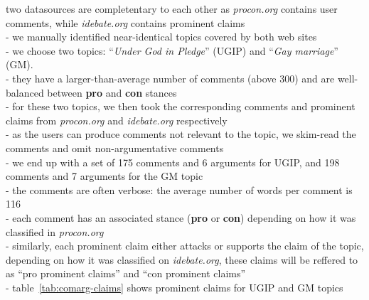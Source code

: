 \noindent two datasources are completentary to each other as 
\textit{procon.org} contains user comments, while \textit{idebate.org} contains prominent 
claims \\
- we manually identified near-identical topics covered by both web sites \\
- we choose two topics: ``\textit{Under God in Pledge}'' (UGIP) and 
``\textit{Gay marriage}'' (GM). \\
- they have a larger-than-average number of comments (above 300) and are 
well-balanced between \textbf{pro} and \textbf{con} stances \\
- for these two topics, we then took the corresponding comments and prominent claims
from \textit{procon.org} and \textit{idebate.org} respectively \\
- as the users can produce comments not relevant to the topic, we skim-read 
the comments and omit non-argumentative comments \\
- we end up with a set of 175 comments and 6 arguments for UGIP, and 198 comments and 7 
arguments for the GM topic \\
- the comments are often verbose: the average number of words per comment is 116 \\
- each comment has an associated stance (\textbf{pro} or \textbf{con}) depending on 
how it was classified in \textit{procon.org} \\
- similarly, each prominent claim either attacks or supports the claim of the topic,
depending on how it was classified on \textit{idebate.org}, these claims will be reffered to 
as ``pro prominent claims'' and ``con prominent claims'' \\
- table~\ref{tab:comarg-claims} shows prominent claims for UGIP and GM topics \\

